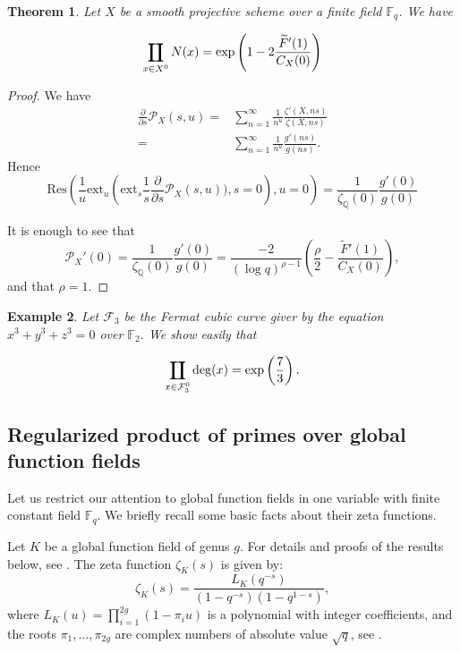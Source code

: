 \documentclass[12pt]{amsart}
\DeclareMathOperator*\Rprod{%
\mathchoice
  {\ooalign{$\displaystyle\prod$\cr\hidewidth$\displaystyle\coprod$\hidewidth\cr}}%
  {\ooalign{$\textstyle\prod$\cr\hidewidth$\textstyle\coprod$\hidewidth\cr}}%
  {\ooalign{$\scriptstyle\prod$\cr\hidewidth$\scriptstyle\coprod$\hidewidth\cr}}%
  {\ooalign{$\scriptscriptstyle\prod$\cr\hidewidth$%
  \scriptscriptstyle\coprod$\hidewidth\cr}}}
\newtheorem{theorem}{Theorem}[section]
\newtheorem{example}[theorem]{Example}
\newcommand{\Q}{\mathbb{Q}}
\begin{document}
\begin{theorem}\label{ThmF}
Let $X$ be a smooth projective scheme over a finite field $\mathbb{F}_q$. We have

\[
\Rprod_{x \in X^0} N (x)=\exp\left(  1 - 2\frac{\widetilde{F}'(1)}{C_X(0)}  \right)
\]

\end{theorem}

\begin{proof}
We have
\[
\begin{split}
\frac{\partial }{\partial s} \mathcal P_X(s,u)=&\sum_{n=1}^\infty \frac{1}{n^u}\frac{\zeta'(X,ns)}{ \zeta(X,ns)}\\
 =& \sum_{n=1}^\infty \frac{1}{n^u}\frac{g'(ns)}{ g(ns)}.
\end{split}
\]
Hence 
\[
\mathrm{Res}\left(\frac{1}{u}\text{ext}_u \left(\mathrm{ext}_s\frac{1}{s}\frac{\partial }{\partial s} \mathcal{P}_X(s,u))  , s=0 \right), u=0 \right)=\frac{1}{\zeta_\Q(0)}\frac{g'(0)}{g(0)}
\]

It is enough to see that
\[
\mathcal P_X'(0) = \frac{1}{\zeta_\Q(0)} \frac{g'(0)}{g(0)} = \frac{-2}{(\log q)^{\rho-1}} \left( \frac{\rho}{2} - \frac{\widetilde{F}'(1)}{C_X(0)} \right),
\]
and that $\rho=1$.


\end{proof}

\begin{example}
Let $\mathcal F_3$ be the Fermat cubic curve giver by the equation $x^3+y^3+z^3=0$ over $\mathbb{F}_2$. We show easily that

\[
\Rprod_{x \in \mathcal{F}_3^0} \deg(x) =\exp\left(\frac{7}{3}\right).
\]
\end{example}


\subsection{Regularized product of primes over global function fields}\label{RFF}

Let us restrict our attention to global function fields in one variable with finite constant field $\mathbb{F}_q$. We briefly recall some basic facts about their zeta functions.


Let $K$ be a global function field of genus $g$. For details and proofs of the results below, see \cite{Rosen}. The zeta function $\zeta_K(s)$ is given by:
\[
\zeta_K(s) = \frac{L_K(q^{-s})}{(1 - q^{-s})(1 - q^{1-s})},
\]
where $L_K(u) = \prod_{i=1}^{2g} (1 - \pi_i u)$ is a polynomial with integer coefficients, and the roots $\pi_1, \dots, \pi_{2g}$ are complex numbers of absolute value $\sqrt{q}$, see \cite[Theorem~5.9]{Rosen}.\\
\end{document}
